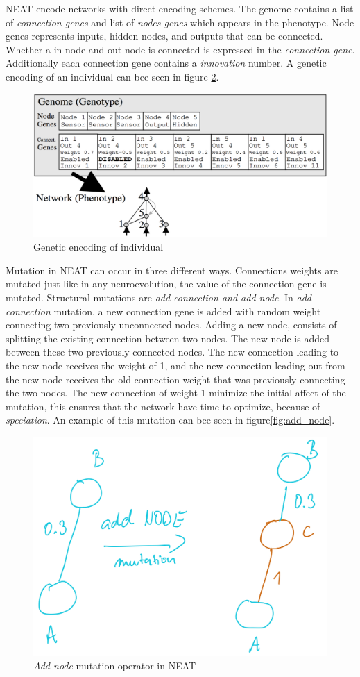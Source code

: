 \documentclass[format=acmsmall, review=false, screen=true]{acmart}
\begin{document}
NEAT encode networks with direct encoding schemes. The genome contains a list of \emph{connection genes} and list of \emph{nodes genes} which appears in the phenotype. Node genes represents inputs, hidden nodes, and outputs that can be connected. Whether a in-node and out-node is connected is expressed in the \emph{connection gene}. Additionally each connection gene contains a \emph{innovation} number. A genetic encoding of an individual can bee seen in figure \ref{fig:genome}.

\begin{figure}[H]
  \includegraphics[width=0.66\linewidth]{img/neat_encoding.PNG}
  \caption{\label{fig:genome}Genetic encoding of individual}
\end{figure}

Mutation in NEAT can occur in three different ways. Connections weights are mutated just like in any neuroevolution, the value of the connection gene is mutated. Structural mutations are \emph{add connection and add node}. In \emph{add connection} mutation, a new connection gene is added with random weight connecting two previously unconnected nodes. Adding a new node, consists of splitting the existing connection between two nodes. The new node is added between these two previously connected nodes. The new connection leading to the new node receives the weight of 1, and the new connection leading out from the new node receives the old connection weight that was previously connecting the two nodes. The new connection of weight 1 minimize the initial affect of the mutation, this ensures that the network have time to optimize, because of \emph{speciation}. An example of this mutation can bee seen in figure\ref{fig:add_node}.

\begin{figure}[H]
  \includegraphics[width=0.66\linewidth]{img/add_node.JPEG}
  \caption{\label{fig:genome}\emph{Add node} mutation operator in NEAT}
\end{figure}
\end{document}
